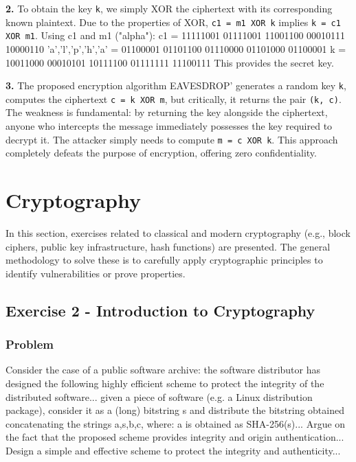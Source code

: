 \documentclass{article}
\begin{document}
\textbf{2.} To obtain the key \texttt{k}, we simply XOR the ciphertext with its corresponding known plaintext. Due to the properties of XOR, \texttt{c1 = m1 XOR k} implies \texttt{k = c1 XOR m1}.
Using c1 and m1 ("alpha"):
c1 = 11111001 01111001 11001100 00010111 10000110
'a','l','p','h','a' = 01100001 01101100 01110000 01101000 01100001
k  = 10011000 00010101 10111100 01111111 11100111
This provides the secret key.

\textbf{3.} The proposed encryption algorithm EAVESDROP' generates a random key \texttt{k}, computes the ciphertext \texttt{c = k XOR m}, but critically, it returns the pair \texttt{(k, c)}. The weakness is fundamental: by returning the key alongside the ciphertext, anyone who intercepts the message immediately possesses the key required to decrypt it. The attacker simply needs to compute \texttt{m = c XOR k}. This approach completely defeats the purpose of encryption, offering zero confidentiality.


\section{Cryptography}
In this section, exercises related to classical and modern cryptography (e.g., block ciphers, public key infrastructure, hash functions) are presented. The general methodology to solve these is to carefully apply cryptographic principles to identify vulnerabilities or prove properties.

\subsection{Exercise 2 - Introduction to Cryptography}
\subsubsection*{Problem}
Consider the case of a public software archive: the software distributor has designed the following highly efficient scheme to protect the integrity of the distributed software... given a piece of software (e.g. a Linux distribution package), consider it as a (long) bitstring s and distribute the bitstring obtained concatenating the strings a,s,b,c, where: a is obtained as SHA-256(s)... Argue on the fact that the proposed scheme provides integrity and origin authentication... Design a simple and effective scheme to protect the integrity and authenticity...
\end{document}

